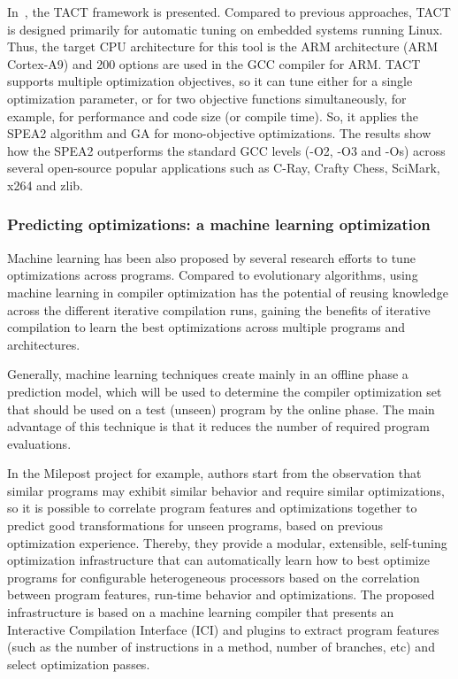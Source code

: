 In~\cite{plotnikov2013automatic}, the TACT framework is presented. 
Compared to previous approaches, TACT is designed primarily for automatic tuning on embedded systems running Linux. Thus, the target CPU architecture for this tool is the ARM architecture (ARM Cortex-A9) and 200 options are used in the GCC compiler for ARM. 
TACT supports multiple optimization objectives, so it can tune either for a single optimization parameter, or for two objective functions simultaneously, for example, for performance and code size (or compile time). So, it applies the SPEA2 algorithm and GA for mono-objective optimizations.
The results show how the SPEA2 outperforms the standard GCC levels (-O2, -O3 and -Os) across several open-source popular applications such as  C-Ray, Crafty Chess, SciMark, x264 and zlib.


 

\subsubsection{Predicting optimizations: a machine learning optimization}
Machine learning has been also proposed by several research efforts to tune optimizations across programs. Compared to evolutionary algorithms, using machine learning in compiler optimization has the potential of reusing knowledge across the different iterative compilation runs, gaining the benefits of iterative compilation to learn the best optimizations across multiple programs and architectures.

Generally, machine learning techniques create mainly in an offline phase a prediction model, which will be used to determine the compiler optimization set that should be used on a test (unseen) program by the online phase. The main advantage of this technique is that it reduces the number of required program evaluations.

In the Milepost project\cite{fursin2011milepost} for example, authors start from the observation that similar programs may exhibit similar behavior and require similar optimizations, so it is possible to correlate program features and optimizations together to predict good transformations for unseen programs, based on previous optimization experience. Thereby, they provide a modular, extensible, self-tuning optimization infrastructure that can automatically learn how to best optimize programs for configurable heterogeneous processors based on the correlation between program features, run-time behavior and optimizations. 
The proposed infrastructure is based on a machine learning compiler that presents an Interactive Compilation Interface (ICI) and plugins to extract program features (such as the number of instructions in a method, number of branches, etc) and select optimization passes. 

